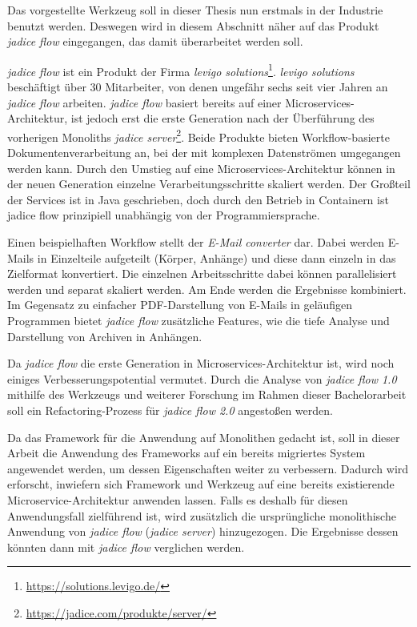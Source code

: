 Das vorgestellte Werkzeug soll in dieser Thesis nun erstmals in der Industrie benutzt werden.
Deswegen wird in diesem Abschnitt näher auf das Produkt \emph{jadice flow} eingegangen, das damit überarbeitet werden soll.

\emph{jadice flow} ist ein Produkt der Firma \emph{levigo solutions}\footnote{\url{https://solutions.levigo.de/}}.
\emph{levigo solutions} beschäftigt über 30 Mitarbeiter, von denen ungefähr sechs seit vier Jahren an \emph{jadice flow} arbeiten.
\emph{jadice flow} basiert bereits auf einer Microservices-Architektur, ist jedoch erst die erste Generation nach der Überführung des vorherigen Monoliths \emph{jadice server}\footnote{\url{https://jadice.com/produkte/server/}}.
Beide Produkte bieten Workflow-basierte Dokumentenverarbeitung an, bei der mit komplexen Datenströmen umgegangen werden kann.
Durch den Umstieg auf eine Microservices-Architektur können in der neuen Generation einzelne Verarbeitungsschritte skaliert werden.
Der Großteil der Services ist in Java geschrieben, doch durch den Betrieb in Containern ist jadice flow prinzipiell unabhängig von der Programmiersprache.

Einen beispielhaften Workflow stellt der \emph{E-Mail converter} dar.
Dabei werden E-Mails in Einzelteile aufgeteilt (Körper, Anhänge) und diese dann einzeln in das Zielformat konvertiert.
Die einzelnen Arbeitsschritte dabei können parallelisiert werden und separat skaliert werden.
Am Ende werden die Ergebnisse kombiniert.
Im Gegensatz zu einfacher PDF-Darstellung von E-Mails in geläufigen Programmen bietet \emph{jadice flow} zusätzliche Features, wie die tiefe Analyse und Darstellung von Archiven in Anhängen.

Da \emph{jadice flow} die erste Generation in Microservices-Architektur ist, wird noch einiges Verbesserungspotential vermutet.
Durch die Analyse von \emph{jadice flow 1.0} mithilfe des Werkzeugs und weiterer Forschung im Rahmen dieser Bachelorarbeit soll ein Refactoring-Prozess für \emph{jadice flow 2.0} angestoßen werden.

Da das Framework für die Anwendung auf Monolithen gedacht ist, soll in dieser Arbeit die Anwendung des Frameworks auf ein bereits migriertes System angewendet werden, um dessen Eigenschaften weiter zu verbessern.
Dadurch wird erforscht, inwiefern sich Framework und Werkzeug auf eine bereits existierende Microservice-Architektur anwenden lassen.
Falls es deshalb für diesen Anwendungsfall zielführend ist, wird zusätzlich die ursprüngliche monolithische Anwendung von \emph{jadice flow} (\emph{jadice server}) hinzugezogen.
Die Ergebnisse dessen könnten dann mit \emph{jadice flow} verglichen werden.



